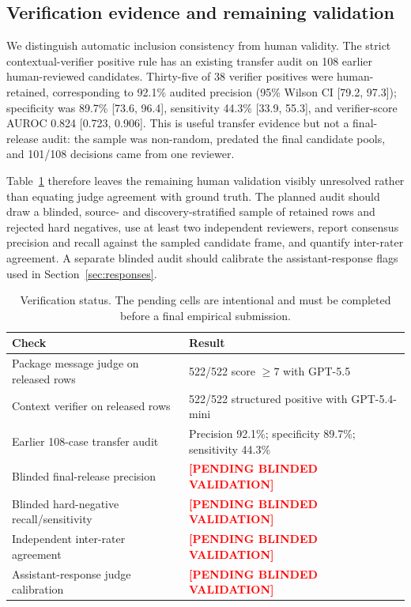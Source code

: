 \documentclass{article}
\newcommand{\auc}{AUROC}
\newcommand{\pending}{\textcolor{red}{\textbf{[PENDING BLINDED VALIDATION]}}}
\begin{document}
\subsection{Verification evidence and remaining validation}

We distinguish automatic inclusion consistency from human validity. The strict contextual-verifier positive rule has an existing transfer audit on 108 earlier human-reviewed candidates. Thirty-five of 38 verifier positives were human-retained, corresponding to 92.1\% audited precision (95\% Wilson CI [79.2, 97.3]); specificity was 89.7\% [73.6, 96.4], sensitivity 44.3\% [33.9, 55.3], and verifier-score \auc{} 0.824 [0.723, 0.906]. This is useful transfer evidence but not a final-release audit: the sample was non-random, predated the final candidate pools, and 101/108 decisions came from one reviewer.

Table~\ref{tab:validation} therefore leaves the remaining human validation visibly unresolved rather than equating judge agreement with ground truth. The planned audit should draw a blinded, source- and discovery-stratified sample of retained rows and rejected hard negatives, use at least two independent reviewers, report consensus precision and recall against the sampled candidate frame, and quantify inter-rater agreement. A separate blinded audit should calibrate the assistant-response flags used in Section~\ref{sec:responses}.

\begin{table}[h]
\caption{Verification status. The pending cells are intentional and must be completed before a final empirical submission.}
\label{tab:validation}
\centering
\small
\begin{tabular}{p{.47\linewidth}p{.43\linewidth}}
\toprule
Check & Result \\
\midrule
Package message judge on released rows & 522/522 score $\geq 7$ with GPT-5.5 \\
Context verifier on released rows & 522/522 structured positive with GPT-5.4-mini \\
Earlier 108-case transfer audit & Precision 92.1\%; specificity 89.7\%; sensitivity 44.3\% \\
Blinded final-release precision & \pending \\
Blinded hard-negative recall/sensitivity & \pending \\
Independent inter-rater agreement & \pending \\
Assistant-response judge calibration & \pending \\
\bottomrule
\end{tabular}
\end{table}
\end{document}
